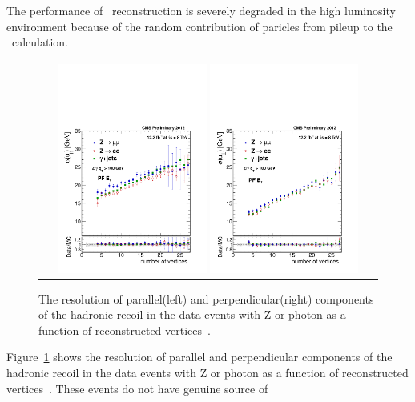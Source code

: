 The performance of \met\ reconstruction is severely degraded 
in the high luminosity environment because of the random contribution of paricles 
from pileup to the \met\ calculation. 
\begin{figure}[htp] 
\centering 
\begin{tabular}{c} 
\includegraphics[width=0.45\textwidth]{figures/Fig11PFresoNVW_para_fit.pdf} 
\includegraphics[width=0.45\textwidth]{figures/Fig11PFresoNVW_perp_fit.pdf} 
\end{tabular} 
\caption{The resolution of parallel(left) and perpendicular(right) components of the
hadronic recoil in the data events with Z or photon as a function of reconstructed
vertices~\cite{CMS-PAS-JME-12-002}.} 
\label{fig:metres} 
\end{figure} 
Figure~\ref{fig:metres} shows the resolution of parallel and perpendicular components of 
the hadronic recoil in the data events with Z or photon as a function of reconstructed 
vertices~\cite{CMS-PAS-JME-12-002}. These events do not have genuine source of 
